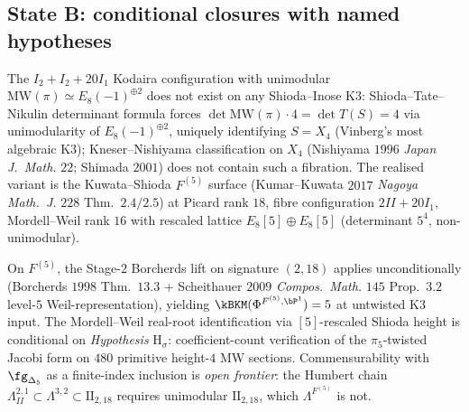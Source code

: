 \subsection{State B: conditional closures with named hypotheses}
\label{wn:subsec:wave3-stateB}

\begin{theorem}
\label{wn:thm:wave3-elliptic-Kuwata-Shioda}\ClaimStatusConjectured
The $I_2 + I_2 + 20 I_1$ Kodaira configuration with unimodular
$\mathrm{MW}(\pi) \simeq E_8(-1)^{\oplus 2}$ does not exist on any
Shioda--Inose K3: Shioda--Tate--Nikulin determinant formula forces
$\det\mathrm{MW}(\pi)\cdot 4 = \det T(S) = 4$ via unimodularity of
$E_8(-1)^{\oplus 2}$, uniquely identifying $S = X_4$ (Vinberg's most
algebraic K3); Kneser--Nishiyama classification on $X_4$ (Nishiyama
$1996$ \emph{Japan J.~Math.} $22$; Shimada $2001$) does not contain
such a fibration. The realised variant is the Kuwata--Shioda $F^{(5)}$
surface (Kumar--Kuwata $2017$ \emph{Nagoya Math.~J.} $228$
Thm.~$2.4/2.5$) at Picard rank $18$, fibre configuration $2II + 20 I_1$,
Mordell--Weil rank $16$ with rescaled lattice $E_8[5]\oplus E_8[5]$
(determinant $5^4$, non-unimodular).

On $F^{(5)}$, the Stage-$2$ Borcherds lift on signature $(2, 18)$
applies unconditionally (Borcherds $1998$ Thm.~$13.3$ + Scheithauer
$2009$ \emph{Compos.~Math.} $145$ Prop.~$3.2$ level-$5$
Weil-representation), yielding
$\kBKM(\Phi^{F^{(5)}, \bP^1}) = 5$ at untwisted K$3$ input. The
Mordell--Weil real-root identification via $[5]$-rescaled Shioda height
is conditional on \emph{Hypothesis} H$_\sigma$: coefficient-count
verification of the $\pi_5$-twisted Jacobi form on $480$ primitive
height-$4$ MW sections. Commensurability with $\fg_{\Delta_5}$ as a
finite-index inclusion is \emph{open frontier}: the Humbert chain
$\Lambda^{2,1}_{II} \subset \Lambda^{3,2} \subset \mathrm{II}_{2, 18}$
requires unimodular $\mathrm{II}_{2, 18}$, which $\Lambda^{F^{(5)}}$ is
not.
\end{theorem}

